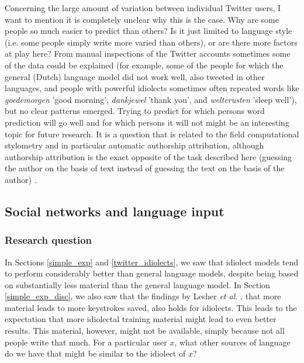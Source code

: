 \documentclass[11pt]{article}
\begin{document}
Concerning the large amount of variation between individual Twitter users, I want to mention it is completely unclear why this is the case. Why are some people so much easier to predict than others? Is it just limited to language style (i.e. some people simply write more varied than others), or are there more factors at play here? From manual inspections of the Twitter accounts sometimes some of the data could be explained (for example, some of the people for which the general (Dutch) language model did not work well, also tweeted in other languages, and people with powerful idiolects sometimes often repeated words like \emph{goedemorgen} 'good morning', \emph{dankjewel} 'thank you', and \emph{welterusten} 'sleep well'), but no clear patterns emerged. Trying to predict for which persons word prediction will go well and for which persons it will not might be an interesting topic for future research. It is a question that is related to the field computational stylometry and in particular automatic authorship attribution, although authorship attribution is the exact opposite of the task described here (guessing the author on the basis of text instead of guessing the text on the basis of the author) \cite{bagavandas+08}.

\subsection{Social networks and language input} \label{input_networks}

\subsubsection{Research question}
In Sections \ref{simple_exp} and \ref{twitter_idiolects}, we saw that idiolect models tend to perform considerably better than general language models, despite being based on substantially less material than the general language model. In Section \ref{simple_exp_disc}, we also saw that the findings by Lesher {\em et al.} , that more material leads to more keystrokes saved, also holds for idiolects. This leads to the expectation that more idiolectal training material might lead to even better results. This material, however, might not be available, simply because not all people write that much. For a particular user $x$, what other sources of language do we have that might be similar to the idiolect of $x$?
\end{document}
